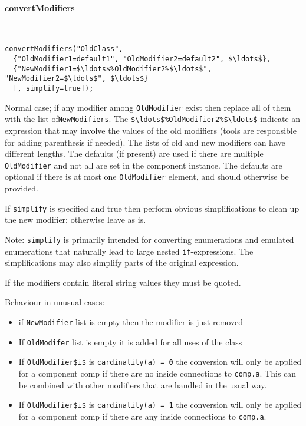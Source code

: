 \paragraph*{convertModifiers}\label{convertmodifiers}
\ %

\begin{lstlisting}[language=modelica]
convertModifiers("OldClass",
  {"OldModifier1=default1", "OldModifier2=default2", $\ldots$},
  {"NewModifier1=$\ldots$%OldModifier2%$\ldots$", "NewModifier2=$\ldots$", $\ldots$}
  [, simplify=true]);
\end{lstlisting}

Normal case; if any modifier among \lstinline!OldModifier! exist then replace all of them with the list of\linebreak[4] \lstinline!NewModifiers!.
The \lstinline!$\ldots$%OldModifier2%$\ldots$! indicate an expression that may involve the values of the old modifiers (tools are responsible for adding parenthesis if needed).
The lists of old and new modifiers can have different lengths.
The defaults (if present) are used if there are multiple \lstinline!OldModifier! and not all are set in the component instance.
The defaults are optional if there is at most one \lstinline!OldModifier! element, and should otherwise be provided.

If \lstinline!simplify! is specified and true then perform obvious simplifications
to clean up the new modifier; otherwise leave as is.

\begin{nonnormative}
Note: \lstinline!simplify! is primarily intended for converting enumerations and emulated enumerations that naturally lead to large nested \lstinline!if!-expressions.
The simplifications may also simplify parts of the original expression.
\end{nonnormative}

If the modifiers contain literal string values they must be quoted.

Behaviour in unusual cases:
\begin{itemize}
\item
  if \lstinline!NewModifier! list is empty then the modifier is just removed
\item
  If \lstinline!OldModifer! list is empty it is added for all uses of the class
\item
  If \lstinline!OldModifier$i$! is \lstinline!cardinality(a) = 0! the conversion will only be applied for a component comp if there are no inside connections to \lstinline!comp.a!. This can be combined with other modifiers that are handled in the usual way.
\item
  If \lstinline!OldModifier$i$! is \lstinline!cardinality(a) = 1! the conversion will only be applied for a component comp if there are any inside connections to \lstinline!comp.a!.
\end{itemize}

